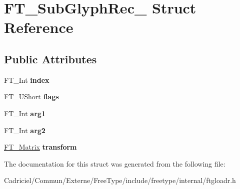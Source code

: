 \hypertarget{struct_f_t___sub_glyph_rec__}{\section{F\-T\-\_\-\-Sub\-Glyph\-Rec\-\_\- Struct Reference}
\label{struct_f_t___sub_glyph_rec__}
}
\subsection*{Public Attributes}
\begin{DoxyCompactItemize}
\item 
\hypertarget{struct_f_t___sub_glyph_rec___aa4febc2d867ff074ac116b068f372d3a}{F\-T\-\_\-\-Int {\bfseries index}}\label{struct_f_t___sub_glyph_rec___aa4febc2d867ff074ac116b068f372d3a}

\item 
\hypertarget{struct_f_t___sub_glyph_rec___a2d02aefc16061f7e039f76074518f6e5}{F\-T\-\_\-\-U\-Short {\bfseries flags}}\label{struct_f_t___sub_glyph_rec___a2d02aefc16061f7e039f76074518f6e5}

\item 
\hypertarget{struct_f_t___sub_glyph_rec___ad9f6b04ef50e1b39db90331e76f38206}{F\-T\-\_\-\-Int {\bfseries arg1}}\label{struct_f_t___sub_glyph_rec___ad9f6b04ef50e1b39db90331e76f38206}

\item 
\hypertarget{struct_f_t___sub_glyph_rec___a0d27a8b473379cedeb061f9ecd7e97da}{F\-T\-\_\-\-Int {\bfseries arg2}}\label{struct_f_t___sub_glyph_rec___a0d27a8b473379cedeb061f9ecd7e97da}

\item 
\hypertarget{struct_f_t___sub_glyph_rec___a3c5fc1959a357c6c2b970ec2118d2683}{\hyperlink{struct_f_t___matrix__}{F\-T\-\_\-\-Matrix} {\bfseries transform}}\label{struct_f_t___sub_glyph_rec___a3c5fc1959a357c6c2b970ec2118d2683}

\end{DoxyCompactItemize}


The documentation for this struct was generated from the following file\-:\begin{DoxyCompactItemize}
\item 
Cadriciel/\-Commun/\-Externe/\-Free\-Type/include/freetype/internal/ftgloadr.\-h\end{DoxyCompactItemize}
